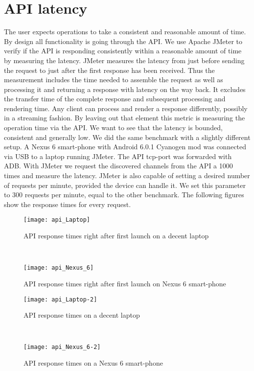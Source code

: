 \section{API latency}
The user expects operations to take a consistent and reasonable amount of time.
By design all functionality is going through the API.
We use Apache JMeter to verify if the API is responding consistently within a reasonable amount of time by measuring the latency.
JMeter measures the latency from just before sending the request to just after the first response has been received. \cite{jmeter_glossary}
Thus the measurement includes the time needed to assemble the request as well as processing it and returning a response with latency on the way back.
It excludes the transfer time of the complete response and subsequent processing and rendering time.
Any client can process and render a response differently, possibly in a streaming fashion.
By leaving out that element this metric is measuring the operation time via the API.
We want to see that the latency is bounded, consistent and generally low.
We did the same benchmark with a slightly different setup.
A Nexus 6 smart-phone with Android 6.0.1 Cyanogen mod was connected via USB to a laptop running JMeter.
The API tcp-port was forwarded with ADB.
With JMeter we request the discovered channels from the API a 1000 times and measure the latency.
JMeter is also capable of setting a desired number of requests per minute, provided the device can handle it.
We set this parameter to 300 requests per minute, equal to the other benchmark.
The following figures show the response times for every request.
\begin{figure}[H]
	\centering
	\begin{minipage}{.49\textwidth}
		\texttt{[image: api\_Laptop]}
		\caption{API response times right after first launch on a decent laptop}
		\label{fig:api_Laptop}
	\end{minipage}
	~
	\begin{minipage}{.49\textwidth}
		\texttt{[image: api\_Nexus\_6]}
		\caption{API response times right after first launch on Nexus 6 smart-phone}
		\label{fig:api_Nexus_6}
	\end{minipage}
	
	\begin{minipage}{.49\textwidth}
		\texttt{[image: api\_Laptop-2]}
		\caption{API response times on a decent laptop}
		\label{fig:api_Laptop-2}
	\end{minipage}
	~
	\begin{minipage}{.49\textwidth}
		\texttt{[image: api\_Nexus\_6-2]}
		\caption{API response times on a Nexus 6 smart-phone}
		\label{fig:api_Nexus_6-2}
	\end{minipage}
\end{figure}
